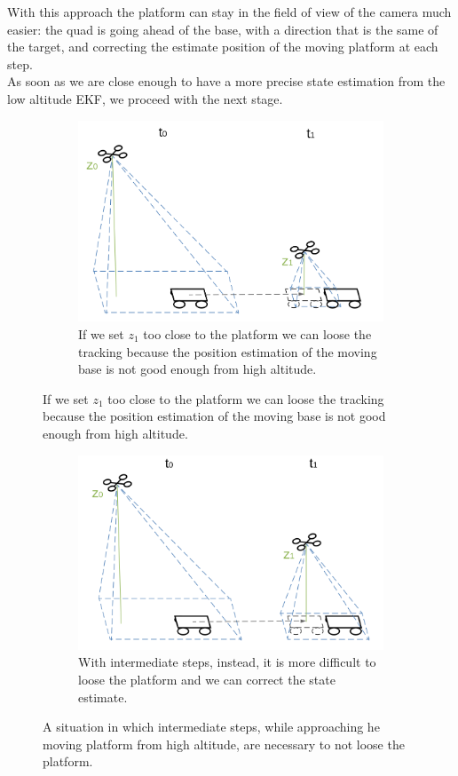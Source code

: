 With this approach the platform can stay in the field of view of the camera much easier:  the quad is going ahead of the base, with a direction that is the same of the target, and correcting the estimate position of the moving platform at each step. \\
As soon as we are close enough to have a more precise state estimation from the low altitude EKF, we proceed with the next stage.

\begin{figure}[!htbp]
 \centering
   \begin{subfigure}[b]{1.0\textwidth}
     \includegraphics[width=\textwidth]{img/approach_platform_lose.png}
        \caption{If we set $z_1$ too close to the platform we can loose the tracking because the position estimation of the moving base is not good enough from high altitude.}
        \label{fig:loose_platform}
   \end{subfigure}
 \end{figure}
\begin{figure}[!htbp] \ContinuedFloat  
   \begin{subfigure}[b]{1.0\textwidth}
     \includegraphics[width=\textwidth]{img/approach_platform.png}
        \caption{With intermediate steps, instead, it is more difficult to loose the platform and we can correct the state estimate.}
        \label{fig:not_loose_platform}
   \end{subfigure}
    \caption{A situation in which intermediate steps, while approaching he moving platform from high altitude, are necessary to not loose the platform.  }
    \label{fig:approach_platform}
\end{figure}
 
